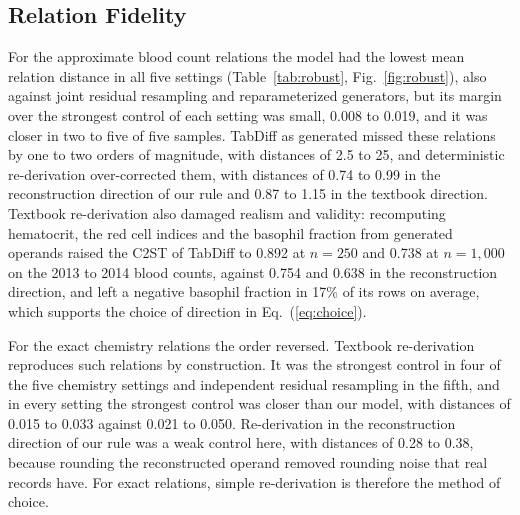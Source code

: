 \documentclass[conference]{IEEEtran}
\begin{document}
\subsection*{Relation Fidelity}

For the approximate blood count relations the model had the lowest mean relation distance in all five settings (Table~\ref{tab:robust}, Fig.~\ref{fig:robust}), also against joint residual resampling and reparameterized generators, but its margin over the strongest control of each setting was small, 0.008 to 0.019, and it was closer in two to five of five samples. TabDiff as generated missed these relations by one to two orders of magnitude, with distances of 2.5 to 25, and deterministic re-derivation over-corrected them, with distances of 0.74 to 0.99 in the reconstruction direction of our rule and 0.87 to 1.15 in the textbook direction. Textbook re-derivation also damaged realism and validity: recomputing hematocrit, the red cell indices and the basophil fraction from generated operands raised the C2ST of TabDiff to 0.892 at $n = 250$ and 0.738 at $n = 1{,}000$ on the 2013 to 2014 blood counts, against 0.754 and 0.638 in the reconstruction direction, and left a negative basophil fraction in 17\% of its rows on average, which supports the choice of direction in Eq.~(\ref{eq:choice}).

For the exact chemistry relations the order reversed. Textbook re-derivation reproduces such relations by construction. It was the strongest control in four of the five chemistry settings and independent residual resampling in the fifth, and in every setting the strongest control was closer than our model, with distances of 0.015 to 0.033 against 0.021 to 0.050. Re-derivation in the reconstruction direction of our rule was a weak control here, with distances of 0.28 to 0.38, because rounding the reconstructed operand removed rounding noise that real records have. For exact relations, simple re-derivation is therefore the method of choice.
\end{document}
